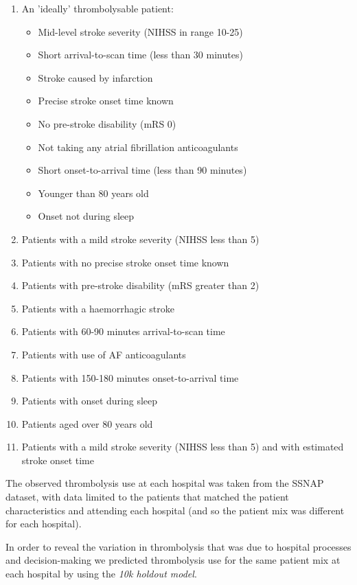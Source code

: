 \begin{enumerate}
  \item An 'ideally' thrombolysable patient:
  \begin{itemize}
    \item Mid-level stroke severity (NIHSS in range 10-25)
    \item Short arrival-to-scan time (less than 30 minutes)
    \item Stroke caused by infarction
    \item Precise stroke onset time known
    \item No pre-stroke disability (mRS 0)
    \item Not taking any atrial fibrillation anticoagulants
    \item Short onset-to-arrival time (less than 90 minutes)
    \item Younger than 80 years old
    \item Onset not during sleep
  \end{itemize}
  \item Patients with a mild stroke severity (NIHSS less than 5)
  \item Patients with no precise stroke onset time known
  \item Patients with pre-stroke disability (mRS greater than 2)
  \item Patients with a haemorrhagic stroke
  \item Patients with 60-90 minutes arrival-to-scan time
  \item Patients with use of AF anticoagulants
  \item Patients with 150-180 minutes onset-to-arrival time
  \item Patients with onset during sleep
  \item Patients aged over 80 years old
  \item Patients with a mild stroke severity (NIHSS less than 5) and with estimated stroke onset time
\end{enumerate}

The observed thrombolysis use at each hospital was taken from the SSNAP dataset, with data limited to the patients that matched the patient characteristics and attending each hospital (and so the patient mix was different for each hospital).

In order to reveal the variation in thrombolysis that was due to hospital processes and decision-making we predicted thrombolysis use for the same patient mix at each hospital by using the \emph{10k holdout model}.




